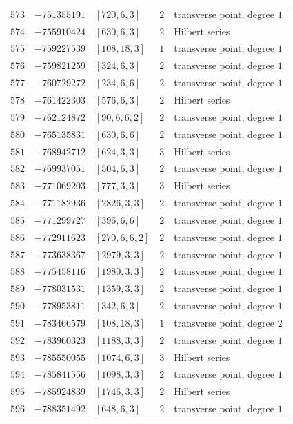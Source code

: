 \documentclass[11pt]{article}
\begin{document}
\begin{center}
\begin{longtable}{r r l c l}
$573$ & $-751355191$ & $[720,6,3]$ & $2$ & transverse point, degree $1$\\
$574$ & $-755910424$ & $[630,6,3]$ & $2$ & Hilbert series\\
$575$ & $-759227539$ & $[108,18,3]$ & $1$ & transverse point, degree $1$\\
$576$ & $-759821259$ & $[324,6,3]$ & $2$ & transverse point, degree $1$\\
$577$ & $-760729272$ & $[234,6,6]$ & $2$ & transverse point, degree $1$\\
$578$ & $-761422303$ & $[576,6,3]$ & $2$ & Hilbert series\\
$579$ & $-762124872$ & $[90,6,6,2]$ & $2$ & transverse point, degree $1$\\
$580$ & $-765135831$ & $[630,6,6]$ & $2$ & transverse point, degree $1$\\
$581$ & $-768942712$ & $[624,3,3]$ & $3$ & Hilbert series\\
$582$ & $-769937051$ & $[504,6,3]$ & $2$ & transverse point, degree $1$\\
$583$ & $-771069203$ & $[777,3,3]$ & $3$ & Hilbert series\\
$584$ & $-771182936$ & $[2826,3,3]$ & $2$ & transverse point, degree $1$\\
$585$ & $-771299727$ & $[396,6,6]$ & $2$ & transverse point, degree $1$\\
$586$ & $-772911623$ & $[270,6,6,2]$ & $2$ & transverse point, degree $1$\\
$587$ & $-773638367$ & $[2979,3,3]$ & $2$ & transverse point, degree $1$\\
$588$ & $-775458116$ & $[1980,3,3]$ & $2$ & transverse point, degree $1$\\
$589$ & $-778031531$ & $[1359,3,3]$ & $2$ & transverse point, degree $1$\\
$590$ & $-778953811$ & $[342,6,3]$ & $2$ & transverse point, degree $1$\\
$591$ & $-783466579$ & $[108,18,3]$ & $1$ & transverse point, degree $2$\\
$592$ & $-783960323$ & $[1188,3,3]$ & $2$ & transverse point, degree $1$\\
$593$ & $-785550055$ & $[1074,6,3]$ & $3$ & Hilbert series\\
$594$ & $-785841556$ & $[1098,3,3]$ & $2$ & transverse point, degree $1$\\
$595$ & $-785924839$ & $[1746,3,3]$ & $2$ & Hilbert series\\
$596$ & $-788351492$ & $[648,6,3]$ & $2$ & transverse point, degree $1$\\

\end{longtable}
\end{center}
\end{document}
